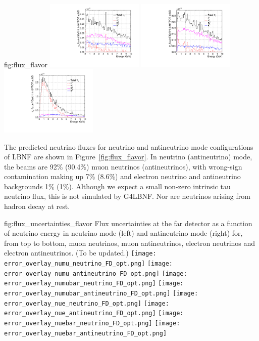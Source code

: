 \begin{dunefigure}{fig:flux_flavor}
     \includegraphics[width=0.35\textwidth]{graphics/dune_antineutrino_nd_nue.pdf}
    \includegraphics[width=0.35\textwidth]{graphics/dune_neutrino_nd_nuebar.pdf}
     \includegraphics[width=0.35\textwidth]{graphics/dune_antineutrino_nd_nuebar.pdf}
\end{dunefigure}

The predicted neutrino fluxes for neutrino and antineutrino mode configurations of LBNF are shown in Figure~\ref{fig:flux_flavor}.  In neutrino (antineutrino) mode, the beams are 92\% (90.4\%) muon neutrinos (antineutrinos), with wrong-sign contamination making up 7\% (8.6\%) and electron neutrino and antineutrino backgrounds 1\% (1\%).  Although %
we expect a small non-zero intrinsic tau neutrino flux, this is not simulated by G4LBNF.  Nor are neutrinos arising from hadron decay at rest. %

\begin{dunefigure}{fig:flux_uncertainties_flavor}
{Flux uncertainties at the far detector as a function of neutrino energy in neutrino mode (left) and antineutrino mode (right) for, from top to bottom, muon neutrinos, muon antineutrinos, electron neutrinos and electron antineutrinos. (To be updated.)   }
    \texttt{[image: error\_overlay\_numu\_neutrino\_FD\_opt.png]}
    \texttt{[image: error\_overlay\_numu\_antineutrino\_FD\_opt.png]}
    \texttt{[image: error\_overlay\_numubar\_neutrino\_FD\_opt.png]}
    \texttt{[image: error\_overlay\_numubar\_antineutrino\_FD\_opt.png]}
        \texttt{[image: error\_overlay\_nue\_neutrino\_FD\_opt.png]}
    \texttt{[image: error\_overlay\_nue\_antineutrino\_FD\_opt.png]}
        \texttt{[image: error\_overlay\_nuebar\_neutrino\_FD\_opt.png]}
    \texttt{[image: error\_overlay\_nuebar\_antineutrino\_FD\_opt.png]}
    \end{dunefigure}

